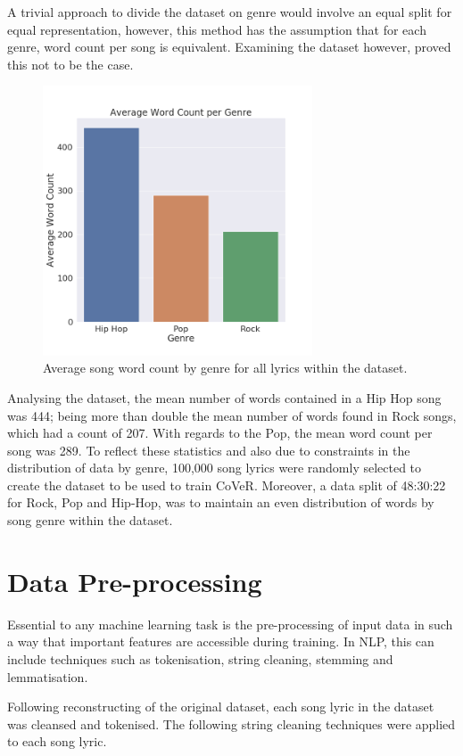 \noindent
\newline
A trivial approach to divide the dataset on genre would involve an equal split for equal representation, however, this method has the assumption that for each genre, word count per song is equivalent. Examining the dataset however, proved this not to be the case.
\begin{figure}[h]
	\includegraphics[width=8cm, height=8cm]{./figures/fig6}
	\centering
	\caption[Average Song Word Count by Genre]{Average song word count by genre for all lyrics within the dataset.}
	\label{fig:fig6}
\end{figure}

\noindent
\newline
Analysing the dataset, the mean number of words contained in a Hip Hop song was 444; being more than double the mean number of words found in Rock songs, which had a count of 207. With regards to the Pop, the mean word count per song was 289. To reflect these statistics and also due to constraints in the distribution of data by genre, 100,000 song lyrics were randomly selected to create the dataset to be used to train CoVeR. Moreover, a data split of 48:30:22 for Rock, Pop and Hip-Hop, was to maintain an even distribution of words by song genre within the dataset.
\section{Data Pre-processing}
Essential to any machine learning task is the pre-processing of input data in such a way that important features are accessible during training. In NLP, this can include techniques such as tokenisation, string cleaning, stemming and lemmatisation.

\noindent
\newline
Following reconstructing of the original dataset, each song lyric in the dataset was cleansed and tokenised. The following string cleaning techniques were applied to each song lyric.

